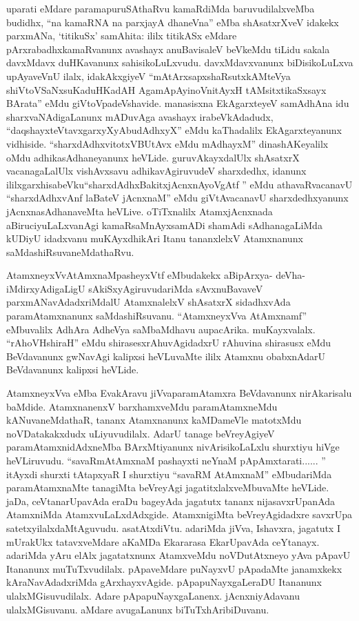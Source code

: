 \begin{artha}
uparati eMdare paramapuruSAthaRvu kamaRdiMda baruvudilalxveMba budidhx, ``na kamaRNA na parxjayA dhaneVna'' eMba shAsatxrXveV idakekx parxmANa, `titikuSx' samAhita: ililx titikASx eMdare pArxrabadhxkamaRvanunx avashayx anuBavisaleV beVkeMdu tiLidu sakala davxMdavx duHKavanunx sahisikoLuLxvudu. davxMdavxvanunx biDisikoLuLxva upAyaveVnU ilalx, idakAkxgiyeV ``mAtArxsapxshaRsutxkAMteVya shiVtoVSaNxsuKaduHKadAH AgamApAyinoV\s nitAyxH tAMsitxtikaSxsayx BArata'' eMdu giVtoVpadeVshavide. manasisxna EkAgarxteyeV samAdhAna idu sharxvaNAdigaLanunx mADuvAga avashayx irabeVkAdadudx, ``daqshayxteVtavxgarxyXyAbudAdhxyX'' eMdu kaThadalilx EkAgarxteyanunx vidhiside. ``sharxdAdhxvitotxVBUtAvx eMdu mAdhayxM'' dinashAKeyalilx oMdu adhikasAdhaneyanunx heVLide. guruvAkayxdalUlx shAsatxrX vacanagaLalUlx vishAvxsavu adhikavAgiruvudeV sharxdedhx, idanunx ililxgarxhisabeVku\ndash  ``sharxdAdhxBakitxjAcnxnAyoVgAtf '' eMdu athavaRvacanavU ``sharxdAdhxvAnf laBateV jAcnxnaM'' eMdu giVtAvacanavU sharxdedhxyanunx jAcnxnasAdhanaveMta heVLive. oTiTxnalilx AtamxjAcnxnada aBiruciyuLaLxvanAgi kamaRsaMnAyxsamADi shamAdi sAdhanagaLiMda kUDiyU idadxvanu muKAyxdhikAri Itanu tananxlelxV Atamxnanunx saMdashiRsuvaneMdathaRvu.
\end{artha}

\begin{artha}
AtamxneyxVvAtAmxnaMpasheyxVtf eMbudakekx aBipArxya- deVha- iMdirxyAdigaLigU sAkiSxyAgiruvudariMda sAvxnuBavaveV parxmANavAdadxriMdalU AtamxnalelxV shAsatxrX sidadhxvAda paramAtamxnanunx saMdashiRsuvanu. ``AtamxneyxVva AtAmxnamf'' eMbuvalilx AdhAra AdheVya saMbaMdhavu aupacArika. muKayxvalalx. ``rAhoVHshiraH'' eMdu shirasesxrAhuvAgidadxrU rAhuvina shirasusx eMdu BeVdavanunx gwNavAgi kalipxsi heVLuvaMte ililx Atamxnu obabxnAdarU BeVdavanunx kalipxsi heVLide.
\end{artha}

\begin{artha}
AtamxneyxVva eMba EvakAravu jiVvaparamAtamxra BeVdavanunx nirAkarisalu baMdide. AtamxnanenxV barxhamxveMdu paramAtamxneMdu kANuvaneMdathaR, tananx Atamxnanunx kaMDameVle matotxMdu noVDatakakxdudx uLiyuvudilalx. AdarU tanage beVreyAgiyeV paramAtamxnidAdxneMba BArxMtiyanunx nivArisikoLaLxlu shurxtiyu hiVge heVLiruvudu. ``savaRmAtAmxnaM pashayxti neYnaM pApAmxtarati...... '' itAyxdi shurxti tAtapxyaR I shurxtiyu ``savaRM AtAmxnaM'' eMbudariMda paramAtamxnaMte tanagiMta beVreyAgi jagatitxlalxveMbuvaMte heVLide. jaDa, ceVtanarUpavAda eraDu bageyAda jagatutx tananx nijasavxrUpanAda AtamxniMda AtamxvuLaLxdAdxgide. AtamxnigiMta beVreyAgidadxre savxrUpa satetxyilalxdaMtAguvudu. asatAtxdiVtu. adariMda jiVva, Ishavxra, jagatutx I mUrakUkx tatavxveMdare aKaMDa Ekararasa EkarUpavAda ceYtanayx. adariMda yAru elAlx jagatatxnunx AtamxveMdu noVDutAtxneyo yAva pApavU Itananunx muTuTxvudilalx. pApaveMdare puNayxvU pApadaMte janamxkekx kAraNavAdadxriMda gArxhayxvAgide. pApapuNayxgaLeraDU Itananunx ulalxMGisuvudilalx. Adare pApapuNayxgaLanenx. jAcnxniyAdavanu ulalxMGisuvanu. aMdare avugaLanunx biTuTxhAribiDuvanu. 
\end{artha}

